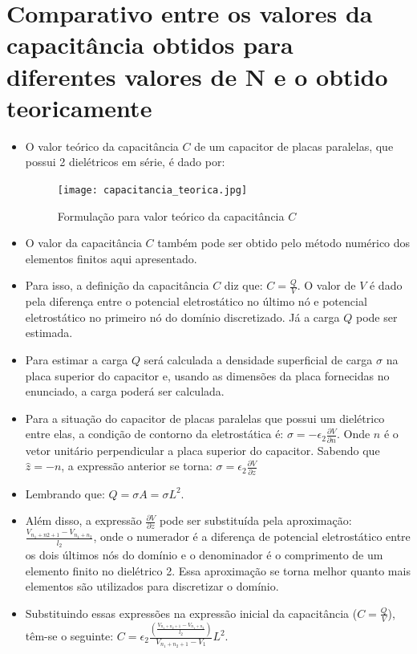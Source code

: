 \documentclass[10pt]{article}
\begin{document}
\section{Comparativo entre os valores da capacitância obtidos para diferentes valores de N e o obtido teoricamente}
    \begin{itemize}
    \item O valor teórico da capacitância $C$ de um capacitor de placas paralelas, que possui 2 dielétricos em série, é dado por:
    
    \begin{figure}[!htb]
    \centerline{\texttt{[image: capacitancia\_teorica.jpg]}}
    \caption{Formulação para valor teórico da capacitância $C$}
    \label{fig:f1}
    \end{figure}
    
    \item O valor da capacitância $C$ também pode ser obtido pelo método numérico dos elementos finitos aqui apresentado.
    \item Para isso, a definição da capacitância $C$ diz que: $C = \frac{Q}{V}$. O valor de $V$ é dado pela diferença entre o potencial eletrostático no último nó e  potencial eletrostático no primeiro nó do domínio discretizado. Já a carga $Q$ pode ser estimada.
    \item Para estimar a carga $Q$ será calculada a densidade superficial de carga $\sigma$ na placa superior do capacitor e, usando as dimensões da placa fornecidas no enunciado, a carga poderá ser calculada.
    \item Para a situação do capacitor de placas paralelas que possui um dielétrico entre elas, a condição de contorno da eletrostática é: $\sigma = -\epsilon_{2}\frac{\partial V}{\partial n}$. Onde $n$ é o vetor unitário perpendicular a placa superior do capacitor. Sabendo que $\hat{z} = -n$, a expressão anterior se torna: $\sigma = \epsilon_{2}\frac{\partial V}{\partial z}$
    \item Lembrando que: $Q = \sigma A = \sigma L^{2}$.
    \item Além disso, a expressão $\frac{\partial V}{\partial z}$ pode ser substituída pela aproximação: $\frac{V_{n_{1} + n{2} + 1} - V_{n_{1} + n_{2}}}{l_{2}}$, onde o numerador é a diferença de potencial eletrostático entre os dois últimos nós do domínio e o denominador é o comprimento de um elemento finito no dielétrico 2. Essa aproximação se torna melhor quanto mais elementos são utilizados para discretizar o domínio.
    \item Substituindo essas expressões na expressão inicial da capacitância ($C = \frac{Q}{V}$), têm-se o seguinte: $C = \epsilon_{2}\frac{(\frac{V_{n_{1} + n_{2} + 1} - V_{n_{1} + n_{2}}}{l_{2}})}{V_{n_{1} + n_{2} + 1} - V_{1}}L^{2}$.

\end{itemize}
\end{document}
